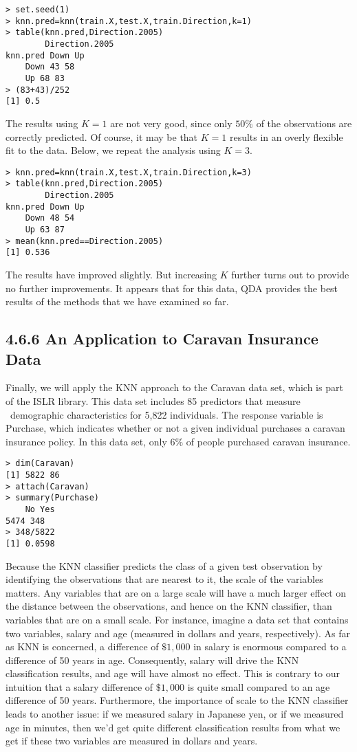 \documentclass[10pt]{article}
\begin{document}
\begin{verbatim}
> set.seed(1)
> knn.pred=knn(train.X,test.X,train.Direction,k=1)
> table(knn.pred,Direction.2005)
        Direction.2005
knn.pred Down Up
    Down 43 58
    Up 68 83
> (83+43)/252
[1] 0.5
\end{verbatim}

The results using $K=1$ are not very good, since only $50 \%$ of the observations are correctly predicted. Of course, it may be that $K=1$ results in an overly flexible fit to the data. Below, we repeat the analysis using $K=3$.

\begin{verbatim}
> knn.pred=knn(train.X,test.X,train.Direction,k=3)
> table(knn.pred,Direction.2005)
        Direction.2005
knn.pred Down Up
    Down 48 54
    Up 63 87
> mean(knn.pred==Direction.2005)
[1] 0.536
\end{verbatim}

The results have improved slightly. But increasing $K$ further turns out to provide no further improvements. It appears that for this data, QDA provides the best results of the methods that we have examined so far.

\subsection*{4.6.6 An Application to Caravan Insurance Data}
Finally, we will apply the KNN approach to the Caravan data set, which is part of the ISLR library. This data set includes 85 predictors that measure\
\
demographic characteristics for 5,822 individuals. The response variable is Purchase, which indicates whether or not a given individual purchases a caravan insurance policy. In this data set, only $6 \%$ of people purchased caravan insurance.

\begin{verbatim}
> dim(Caravan)
[1] 5822 86
> attach(Caravan)
> summary(Purchase)
    No Yes
5474 348
> 348/5822
[1] 0.0598
\end{verbatim}

Because the KNN classifier predicts the class of a given test observation by identifying the observations that are nearest to it, the scale of the variables matters. Any variables that are on a large scale will have a much larger effect on the distance between the observations, and hence on the KNN classifier, than variables that are on a small scale. For instance, imagine a data set that contains two variables, salary and age (measured in dollars and years, respectively). As far as KNN is concerned, a difference of $\$ 1,000$ in salary is enormous compared to a difference of 50 years in age. Consequently, salary will drive the KNN classification results, and age will have almost no effect. This is contrary to our intuition that a salary difference of $\$ 1,000$ is quite small compared to an age difference of 50 years. Furthermore, the importance of scale to the KNN classifier leads to another issue: if we measured salary in Japanese yen, or if we measured age in minutes, then we'd get quite different classification results from what we get if these two variables are measured in dollars and years.
\end{document}
